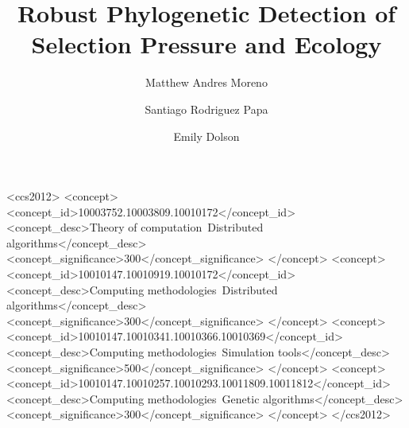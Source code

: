 \documentclass[dvipsnames,format=sigconf,anonymous=true]{acmart}
\begin{document}
\title{Robust Phylogenetic Detection of Selection Pressure and Ecology}

\author{Matthew Andres Moreno}

\author{Santiago Rodriguez Papa}

\author{Emily Dolson}

\renewcommand{\shortauthors}{Moreno et al.}






% 
\begin{CCSXML}
<ccs2012>
   <concept>
       <concept_id>10003752.10003809.10010172</concept_id>
       <concept_desc>Theory of computation~Distributed algorithms</concept_desc>
       <concept_significance>300</concept_significance>
       </concept>
   <concept>
       <concept_id>10010147.10010919.10010172</concept_id>
       <concept_desc>Computing methodologies~Distributed algorithms</concept_desc>
       <concept_significance>300</concept_significance>
       </concept>
   <concept>
       <concept_id>10010147.10010341.10010366.10010369</concept_id>
       <concept_desc>Computing methodologies~Simulation tools</concept_desc>
       <concept_significance>500</concept_significance>
       </concept>
   <concept>
       <concept_id>10010147.10010257.10010293.10011809.10011812</concept_id>
       <concept_desc>Computing methodologies~Genetic algorithms</concept_desc>
       <concept_significance>300</concept_significance>
       </concept>
 </ccs2012>
\end{CCSXML}
\end{document}
